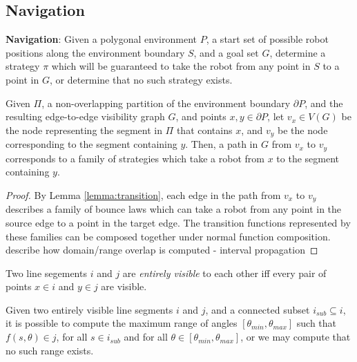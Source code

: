 \documentclass[]{styles/svproc}  %
\begin{document}
\subsection{Navigation}

\begin{definition}
\textbf{Navigation}:
Given a polygonal environment $P$, a start set of possible robot positions along the
environment boundary $S$, and a goal set $G$, determine a strategy $\pi$ which
will be guaranteed to take the robot from any point in $S$ to a point in $G$, or
determine that no such strategy exists.
\end{definition}

\begin{lemma}
Given $\Pi$, a non-overlapping partition of the environment boundary $\partial P$, and the resulting edge-to-edge visibility graph
$G$, and points $x,y \in \partial P$, let $v_x \in V(G)$ be the node representing
the segment in $\Pi$ that contains $x$, and $v_y$ be the node corresponding to
the segment containing $y$. Then, a path in $G$ from $v_x$ to $v_y$ corresponds
to a family of strategies which take a robot from $x$ to the segment containing
$y$.
\end{lemma}

\begin{proof}
By Lemma \ref{lemma:transition}, each edge in the path from $v_x$ to $v_y$
describes a family of bounce laws which can take a robot from any point in the
source edge to a point in the target edge. The transition functions represented
by these families can be composed together under normal function composition.
{\color{red} describe how domain/range overlap is computed - interval propagation}
\end{proof}

\begin{definition}
Two line segements $i$ and $j$ are \emph{entirely visible} to each other iff
every pair of points $x \in i$ and $y \in j$ are visible.
\end{definition}

\begin{proposition}
Given two entirely visible line segments $i$ and $j$, and a connected subset
$i_{sub} \subseteq i$, it is possible to compute the maximum range of angles 
$[\theta_{min}, \theta_{max}]$ such that $f(s, \theta) \in j$, for all $s \in
i_{sub}$ and for all $\theta \in [\theta_{min}, \theta_{max}]$, or we may
compute that no such range exists.
\end{proposition}
\end{document}
